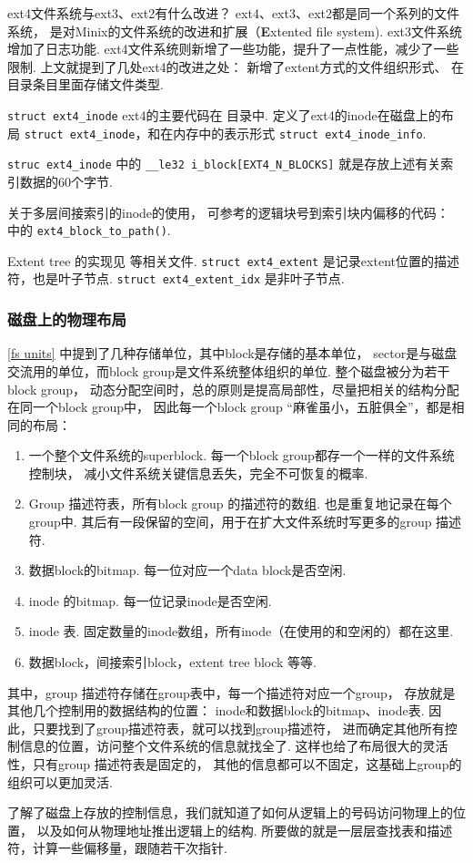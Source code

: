 \begin{qbox}{ext4文件系统与ext3、ext2有什么改进？}
	ext4、ext3、ext2都是同一个系列的文件系统，
	是对Minix的文件系统的改进和扩展（\textbf{E}xtented file system).
	ext3文件系统增加了日志功能.
	ext4文件系统则新增了一些功能，提升了一点性能，减少了一些限制.
	上文就提到了几处ext4的改进之处：
	新增了extent方式的文件组织形式、
	在目录条目里面存储文件类型.
\end{qbox}

\begin{readsrcbox}{\lstinline{struct ext4_inode}}
	ext4的主要代码在  目录中.
	 定义了ext4的inode在磁盘上的布局 \lstinline{struct ext4_inode}，和在内存中的表示形式 \lstinline{struct ext4_inode_info}.

	\lstinline{struc ext4_inode} 中的
	\lstinline{__le32 i_block[EXT4_N_BLOCKS]}
	就是存放上述有关索引数据的60个字节.

	关于多层间接索引的inode的使用，
	可参考的逻辑块号到索引块内偏移的代码：
	 中的 \lstinline{ext4_block_to_path()}.

	Extent tree 的实现见  等相关文件.
	\lstinline{struct ext4_extent} 是记录extent位置的描述符，也是叶子节点.
	\lstinline{struct ext4_extent_idx} 是非叶子节点.
\end{readsrcbox}

\subsubsection{磁盘上的物理布局}
\ref{fs units} 中提到了几种存储单位，其中block是存储的基本单位，
sector是与磁盘交流用的单位，而block group是文件系统整体组织的单位.
整个磁盘被分为若干block group，
动态分配空间时，总的原则是提高局部性，尽量把相关的结构分配在同一个block group中，
因此每一个block group “麻雀虽小，五脏俱全”，都是相同的布局\cite{ext4high}：
\begin{enumerate}
	\item 一个整个文件系统的superblock. 
	      每一个block group都存一个一样的文件系统控制块，
	      减小文件系统关键信息丢失，完全不可恢复的概率.
	\item Group 描述符表，所有block group 的描述符的数组. 
	      也是重复地记录在每个group中.
	      其后有一段保留的空间，用于在扩大文件系统时写更多的group 描述符.
	\item 数据block的bitmap. 每一位对应一个data block是否空闲.
	\item inode 的bitmap. 每一位记录inode是否空闲.
	\item inode 表.
	      固定数量的inode数组，所有inode（在使用的和空闲的）都在这里.
	\item 数据block，间接索引block，extent tree block 等等.
\end{enumerate}
其中，group 描述符存储在group表中，每一个描述符对应一个group，
存放就是其他几个控制用的数据结构的位置：
inode和数据block的bitmap、inode表.
因此，只要找到了group描述符表，就可以找到group描述符，
进而确定其他所有控制信息的位置，访问整个文件系统的信息就找全了.
这样也给了布局很大的灵活性，只有group 描述符表是固定的，
其他的信息都可以不固定，这基础上group的组织可以更加灵活.\cite{ext4global}

了解了磁盘上存放的控制信息，我们就知道了如何从逻辑上的号码访问物理上的位置，
以及如何从物理地址推出逻辑上的结构.
所要做的就是一层层查找表和描述符，计算一些偏移量，跟随若干次指针.

